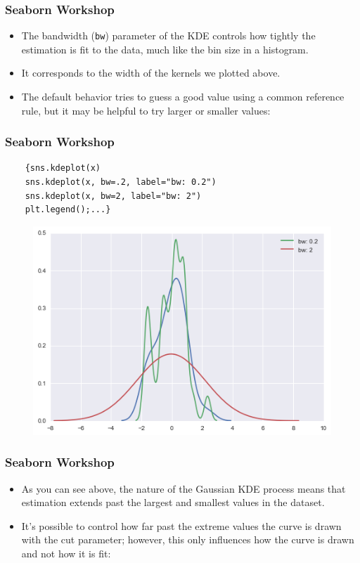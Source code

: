 \documentclass{beamer}
\begin{document}
\begin{frame}[fragile]
	\frametitle{Seaborn Workshop}
	\large
	\begin{itemize}
		\item The bandwidth (\texttt{bw}) parameter of the KDE controls how tightly the estimation is fit to the data, much like the bin size in a histogram. 
		\item It corresponds to the width of the kernels we plotted above. \item The default behavior tries to guess a good value using a common reference rule, but it may be helpful to try larger or smaller values:
	\end{itemize}
	
	
\end{frame}
\begin{frame}[fragile]
	\frametitle{Seaborn Workshop}
	\large
	\begin{verbatim}
	{sns.kdeplot(x)
	sns.kdeplot(x, bw=.2, label="bw: 0.2")
	sns.kdeplot(x, bw=2, label="bw: 2")
	plt.legend();...}
	\end{verbatim}
	
	\begin{figure}
		\centering
		\includegraphics[width=0.7\linewidth]{images/distributions_22_0}
	\end{figure}
	
\end{frame}
\begin{frame}[fragile]
	\frametitle{Seaborn Workshop}
	\large
	\begin{itemize}
		\item As you can see above, the nature of the Gaussian KDE process means that estimation extends past the largest and smallest values in the dataset. 
		\item It’s possible to control how far past the extreme values the curve is drawn with the cut parameter; however, this only influences how the curve is drawn and not how it is fit:
	\end{itemize}
\end{frame}
\end{document}
